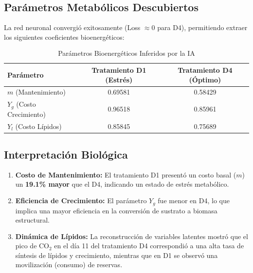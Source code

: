 
\subsection{Parámetros Metabólicos Descubiertos}
La red neuronal convergió exitosamente (Loss $\approx 0$ para D4), permitiendo extraer los siguientes coeficientes bioenergéticos:

\begin{table}[H]
\centering
\caption{Parámetros Bioenergéticos Inferidos por la IA}
\label{tab:params}
\begin{tabular}{@{}lcc@{}}
\toprule
\textbf{Parámetro} & \textbf{Tratamiento D1 (Estrés)} & \textbf{Tratamiento D4 (Óptimo)} \\ \midrule
$m$ (Mantenimiento) & 0.69581 & 0.58429 \\
$Y_g$ (Costo Crecimiento) & 0.96518 & 0.85961 \\
$Y_l$ (Costo Lípidos) & 0.85845 & 0.75689 \\ \bottomrule
\end{tabular}
\end{table}

\subsection{Interpretación Biológica}
\begin{enumerate}
    \item \textbf{Costo de Mantenimiento:} El tratamiento D1 presentó un costo basal ($m$) un \textbf{19.1\% mayor} que el D4, indicando un estado de estrés metabólico.
    \item \textbf{Eficiencia de Crecimiento:} El parámetro $Y_g$ fue menor en D4, lo que implica una mayor eficiencia en la conversión de sustrato a biomasa estructural.
    \item \textbf{Dinámica de Lípidos:} La reconstrucción de variables latentes mostró que el pico de CO$_2$ en el día 11 del tratamiento D4 correspondió a una alta tasa de síntesis de lípidos y crecimiento, mientras que en D1 se observó una movilización (consumo) de reservas.
\end{enumerate}
